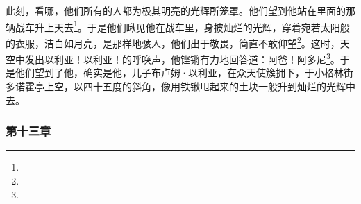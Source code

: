 \par 此刻，看哪，他们所有的人都为极其明亮的光辉所笼罩。他们望到他站在里面的那辆战车升上天去\footnote{}。于是他们瞅见他在战车里，身披灿烂的光辉，穿着宛若太阳般的衣服，洁白如月亮，是那样地骇人，他们出于敬畏，简直不敢仰望\footnote{}。这时，天空中发出以利亚！以利亚！的呼唤声，他铿锵有力地回答道：阿爸！阿多尼\footnote{}。于是他们望到了他，确实是他，儿子布卢姆·以利亚，在众天使簇拥下，于小格林街多诺霍亭上空，以四十五度的斜角，像用铁锹甩起来的土块一般升到灿烂的光辉中去。








\subsubsection*{第十三章}

